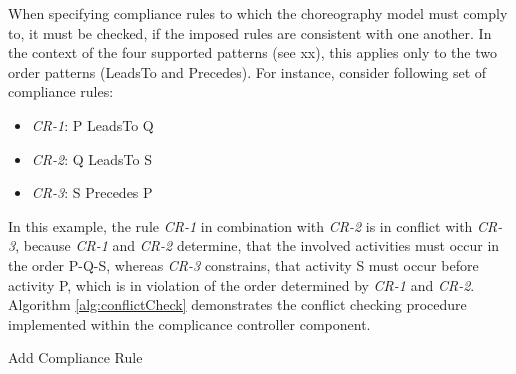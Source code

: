 When specifying compliance rules to which the choreography model must comply to, it must be checked, if the imposed rules are consistent with one another. In the context of the four supported patterns (see xx), this applies only to the two order patterns (LeadsTo and Precedes). For instance, consider following set of compliance rules:

\begin{itemize}
\item \textit{CR-1}: P LeadsTo Q
\item \textit{CR-2}: Q LeadsTo S
\item \textit{CR-3}: S Precedes P
\end{itemize}

In this example, the rule \textit{CR-1} in combination with \textit{CR-2} is in conflict with \textit{CR-3}, because \textit{CR-1} and \textit{CR-2} determine, that the involved activities must occur in the order P-Q-S, whereas \textit{CR-3} constrains, that activity S must occur before activity P, which is in violation of the order determined by \textit{CR-1} and \textit{CR-2}. Algorithm \ref{alg:conflictCheck} demonstrates the conflict checking procedure implemented within the complicance controller component. \\

\begin{algorithm}[H]
\DontPrintSemicolon
\SetAlgoLined
{}

\caption{Add Compliance Rule}
\label{alg:conflictCheck}
\end{algorithm}

